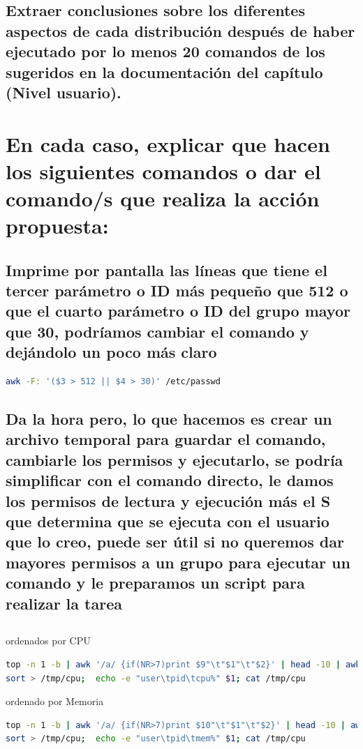 \documentclass[preprint,11pt]{elsarticle}
\begin{document}
\subsection{Extraer conclusiones sobre los diferentes aspectos de cada distribución
después de haber ejecutado por lo menos 20 comandos de los sugeridos en
la documentación del capítulo (Nivel usuario).}


\section{En cada caso, explicar que hacen los siguientes comandos o dar el
comando/s que realiza la acción propuesta: }

\subsection{Imprime por pantalla las líneas que tiene el tercer parámetro o ID más pequeño que 512 o que el cuarto parámetro o ID del grupo mayor que 30,  podríamos cambiar el comando y dejándolo un poco más claro}
\begin{lstlisting}[language=bash]
awk -F: '($3 > 512 || $4 > 30)' /etc/passwd  
\end{lstlisting}

\subsection{Da la hora pero, lo que hacemos es crear un archivo temporal para guardar el comando, cambiarle los permisos y ejecutarlo, se podría simplificar con el comando directo, le damos los permisos de lectura y ejecución más el S que determina que se ejecuta con el usuario que lo creo, puede ser útil si no queremos dar mayores permisos a un grupo para ejecutar un comando y le preparamos un script para realizar la tarea}

\subsection{}

ordenados por CPU 
\begin{lstlisting}[language=bash,  basicstyle=\tiny,]
top -n 1 -b | awk '/a/ {if(NR>7)print $9"\t"$1"\t"$2}' | head -10 | awk '{print $3"\t"$2"\t"$1}' |
sort > /tmp/cpu;  echo -e "user\tpid\tcpu%" $1; cat /tmp/cpu
\end{lstlisting}

ordenado por Memoria

\begin{lstlisting}[language=bash,  basicstyle=\tiny,]
top -n 1 -b | awk '/a/ {if(NR>7)print $10"\t"$1"\t"$2}' | head -10 | awk '{print $3"\t"$2"\t"$1}' |
sort > /tmp/cpu;  echo -e "user\tpid\tmem%" $1; cat /tmp/cpu

\end{lstlisting}
\end{document}

